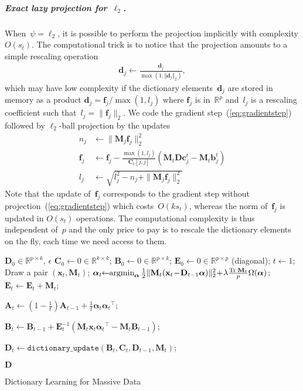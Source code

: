 \documentclass{article}
\def\EE{{\mathbf E}}
\def\RR{{\mathbb{R}}}
\def\Real{{\mathbb{R}}}
\def\x{{\mathbf x}}
\def\f{{\mathbf f}}
\def\c{{\mathbf c}}
\def\A{{\mathbf A}}
\def\B{{\mathbf B}}
\def\b{{\mathbf b}}
\def\C{{\mathbf C}}
\def\D{{\mathbf D}}
\def\d{{\mathbf d}}
\def\b{{\mathbf b}}
\def\x{{\mathbf x}}
\def\Real{{\mathbb R}}
\def\M{{\mathbf M}}
\def\trace{{\mathrm{Tr}\;}}
\newcommand{\transpose}{^\top}
\newcommand{\argmin}{\operatornamewithlimits{\mathrm{argmin}}}
\newcommand{\balpha}{\boldsymbol{\alpha}}
\begin{document}
\subparagraph{Exact lazy projection for~$\ell_2$.}
When~$\psi=\ell_2$, it is possible to perform the projection implicitly with
complexity $O(s_t)$.  The computational trick is to notice that the projection
amounts to a simple rescaling operation
\begin{align}
	\label{eq:l2_proj}
	\d_j \gets \frac{\d_j}{\max(1, \Vert \d_j \Vert_2)},
\end{align}
which may have low complexity if the dictionary elements~$\d_j$ are stored in
memory as a product $\d_j{=}\f_j/\max(1,l_j)$ where $\f_j$ is in~$\Real^{p}$
and~$l_j$ is a rescaling coefficient such that~$l_j = \|\f_j\|_2$. We code the gradient
 step~(\ref{eq:gradientstep}) followed by $\ell_2$-ball projection by the updates
\begin{equation}
	\begin{split}
      n_j &\leftarrow  \|\M_j\f_j\|_2^2\\
	  \f_j &\leftarrow \f_j - \frac{\max(1,l_j)}{\C_t[j,j]}(\M_t\D\c_j^t - \M_t\b_j^t) \\
      l_j & \leftarrow \sqrt{ l_j^2 - n_j + \|\M_j\f_j\|_2^2}
  \end{split}
\end{equation}
Note that the update of~$\f_j$ corresponds to the gradient step without
projection~(\ref{eq:gradientstep}) which costs~$O(k s_t)$, whereas the norm
of~$\f_j$ is updated in $O(s_t)$ operations.
The computational complexity is thus independent of~$p$ and the only price to pay
is to rescale the dictionary elements on the fly, each time we need access to them.

\begin{algorithm}[t]
\begin{algorithmic}
    \REQUIRE {} $\D_0 \in \RR^{p \times k}$,
    \; $\epsilon$
    \STATE $\C_0 \gets 0 \in \RR^{k \times k}$; \qquad $\B_0 \gets 0 \in \RR^{p \times k}$;
    \STATE $\EE_0 \gets 0 \in \RR^{p\times p }$ (diagonal); \qquad $t \gets 1$;
    \REPEAT
    \STATE Draw a pair $(\x_t,\M_t)$;
    \STATE $\balpha_t \!\! \gets \!\! \argmin_{\balpha}\frac{1}{2}
        \Vert \M_t (\x_t \!-\! \D_{t-1} \balpha) \Vert_2^2 \!+\! \lambda \frac{\trace \M_t}{p} \Omega
        (\balpha)$; \\

        \STATE $\EE_t \gets \EE_t + \M_t$;

        \STATE $\A_t \gets (1 - \frac{1}{t}) \A_{t-1} + \frac{1}{t}
        \balpha_t {\balpha_t}\transpose$;

        \STATE $\B_t \gets \B_{t-1} + \EE_t^{-1} (
        \M_t \x_t {\balpha_t}\transpose - \M_t \B_{t-1})$;

        \STATE $\D_t \gets \mathtt{dictionary\_update}(\B_t,\C_t, \D_{t-1}, \M_t)$;

    \UNTIL{$| \frac{h_{t-1}(\D_{t-1})}{h_t(\D_t)} -1 | < \epsilon$}

    \ENSURE $\D$
\end{algorithmic}
\caption{Dictionary Learning for Massive Data}
\label{alg:dl}
\end{algorithm}
\end{document}
